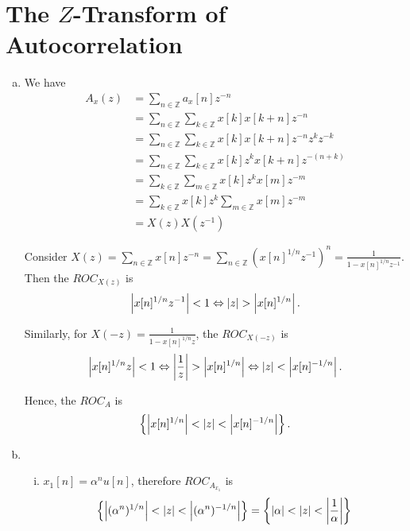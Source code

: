 \section{The $Z$-Transform of Autocorrelation}\label{sec:p4}

\begin{enumerate}[(a)]
\item We have
\begin{align*}
	A_x(z) 
	&= \sum_{n \in \mathbb{Z}} a_x[n] z^{-n} \\
	&= \sum_{n \in \mathbb{Z}} \sum_{k \in \mathbb{Z}} x[k] x[k+n] z^{-n} \\
	&= \sum_{n \in \mathbb{Z}} \sum_{k \in \mathbb{Z}} x[k] x[k+n] z^{-n} z^k z^{-k}\\
	&= \sum_{n \in \mathbb{Z}} \sum_{k \in \mathbb{Z}} x[k] z^k x[k+n] z^{-(n+k)}\\
	&= \sum_{k \in \mathbb{Z}} \sum_{m \in \mathbb{Z}} x[k] z^k x[m] z^{-m}\\
	&= \sum_{k \in \mathbb{Z}} x[k] z^k \sum_{m \in \mathbb{Z}} x[m] z^{-m}\\
	&= X(z) X(z^{-1})
\end{align*}

Consider $X(z) = \sum_{n \in \mathbb{Z}} x[n] z^{-n} = \sum_{n \in \mathbb{Z}} (x[n]^{1/n} z^{-1})^n = \frac{1}{1 - x[n]^{1/n} z^{-1}}$. Then the $ROC_{X(z)}$ is
\[ \left\lvert x[n]^{1/n}z^{-1} \right\rvert < 1 \Leftrightarrow \left\lvert z \right\rvert > \left\lvert x[n]^{1/n} \right\rvert .\]

Similarly, for $X(-z) = \frac{1}{1 - x[n]^{1/n} z}$, the $ROC_{X(-z)}$ is
\[ \left\lvert x[n]^{1/n}z \right\rvert < 1 \Leftrightarrow \left\lvert \frac{1}{z} \right\rvert > \left\lvert x[n]^{1/n} \right\rvert \Leftrightarrow \left\lvert z \right\rvert < \left\lvert x[n]^{-1/n} \right\rvert .\]

Hence, the $ROC_{A}$ is
\[ \left\{ \left\lvert x[n]^{1/n} \right\rvert < \left\lvert z \right\rvert < \left\lvert x[n]^{-1/n} \right\rvert \right\}.\]

\item 
\begin{enumerate}[i.]
	\item $x_1[n] = \alpha^n u[n]$, therefore $ROC_{A_{x_1}}$ is 
	\[\left\{ \left\lvert (\alpha^n)^{1/n} \right\rvert < \left\lvert z \right\rvert < \left\lvert (\alpha^n)^{-1/n} \right\rvert \right\} = \left\{ \left\lvert \alpha \right\rvert < \left\lvert z \right\rvert < \left\lvert \frac{1}{\alpha} \right\rvert \right\}\]
	

\end{enumerate}
\end{enumerate}
